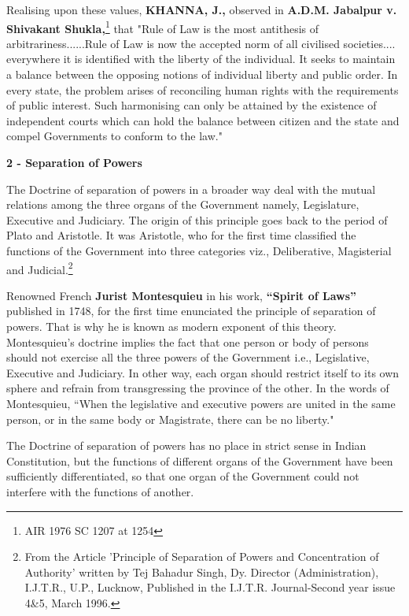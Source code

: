 \begin{multicols}{2}
\noi
Realising upon these values, \textbf{KHANNA, J.,} observed in \textbf{A.D.M. Jabalpur v. Shivakant Shukla,}\footnote{AIR 1976 SC 1207 at 1254} that "Rule of Law is the most antithesis of arbitrariness......Rule of Law is now the accepted norm of all civilised societies.... everywhere it is identified with the liberty of the
individual. It seeks to maintain a balance between the opposing notions of individual liberty and
public order. In every state, the problem arises of reconciling human rights with the requirements
of public interest. Such harmonising can only be attained by the existence of independent courts
which can hold the balance between citizen and the state and compel Governments to conform to
the law."

\noi
{\large \bfseries 2 - Separation of Powers}

\noi
The Doctrine of separation of powers in a broader way deal with the mutual relations among the
three organs of the Government namely, Legislature, Executive and Judiciary. The origin of this
principle goes back to the period of Plato and Aristotle. It was Aristotle, who for the first time classified the functions of the Government into three categories viz., Deliberative, Magisterial
and Judicial.\footnote{From the Article 'Principle of Separation of Powers and Concentration of Authority' written by Tej Bahadur Singh, Dy. Director (Administration), I.J.T.R., U.P., Lucknow, Published in the I.J.T.R. Journal-Second year issue 4\&5, March 1996.}

\noi
Renowned French \textbf{Jurist Montesquieu} in his work, \textbf{“Spirit of Laws”} published in 1748, for the
first time enunciated the principle of separation of powers. That is why he is known as modern
exponent of this theory. Montesquieu's doctrine implies the fact that one person or body of persons
should not exercise all the three powers of the Government i.e., Legislative, Executive and
Judiciary. In other way, each organ should restrict itself to its own sphere and refrain from
transgressing the province of the other. In the words of Montesquieu, “When the legislative and
executive powers are united in the same person, or in the same body or Magistrate, there can be
no liberty."

\noi
The Doctrine of separation of powers has no place in strict sense in Indian Constitution, but the
functions of different organs of the Government have been sufficiently differentiated, so that one
organ of the Government could not interfere with the functions of another.


\end{multicols}
